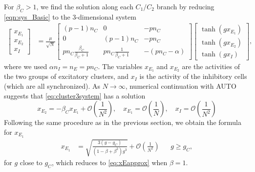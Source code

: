 \documentclass[11pt,reqno]{amsart}
\begin{document}
For $\beta_C > 1$, we find the solution along each $C_1/C_2$ branch by reducing \cref{eqn:sys_Basic} to the 3-dimensional system
\begin{equation}\label{eq:cluster3system}
 \begin{aligned}
 \begin{bmatrix} x_{E_1} \\ x_{E_2} \\ x_{I} \end{bmatrix} 
 &= \frac{\mu}{\sqrt{N}} 
 \begin{bmatrix} 
    (p-1)n_C & 0 & -p n_C  \\
    0  & (p-1)n_C & -p n_C \\
    p n_C \frac{\beta_C}{\beta_C+1} &
    p n_C \frac{1}{\beta_C+1} &
    -(p n_C - \alpha)
 \end{bmatrix}
 \begin{bmatrix} \tanh(g x_{E_1}) \\\tanh ( g x_{E_2} ) \\\tanh(g x_{I})\end{bmatrix},
 \end{aligned}
 \end{equation}
 where we used $\alpha n_I = n_E = p n_C$. The variables $x_{E_1}$ and $x_{E_2}$ are the activities of the two groups of excitatory clusters, and $x_I$ is the activity of the inhibitory cells (which are all synchronized). As $N \rightarrow \infty$, numerical continuation with AUTO suggests that \cref{eq:cluster3system} has a solution
\begin{equation}\label{eq:I1I2asymp}
    x_{E_2} = -\beta_C x_{E_1} + \mathcal{O}\left( \frac{1}{N^2} \right), \quad 
    x_{E_1} = \mathcal{O}\left( \frac{1}{N} \right), \quad
    x_I = \mathcal{O}\left( \frac{1}{N^2} \right)
\end{equation}
Following the same procedure as in the previous section, we obtain the formula for $x_{E_1}$
 \begin{align}\label{eq:XE1}
 x_{E_1} &= \sqrt{ \frac{ 3(g - g_C) }{ (1 - \beta + \beta^2 )g^3}} + \mathcal{O}\left( \frac{1}{N^2}\right)&& g \geq g_C,
\end{align}
for $g$ close to $g_C$, which reduces to \cref{eq:xEapprox} when $\beta = 1$.
\end{document}
